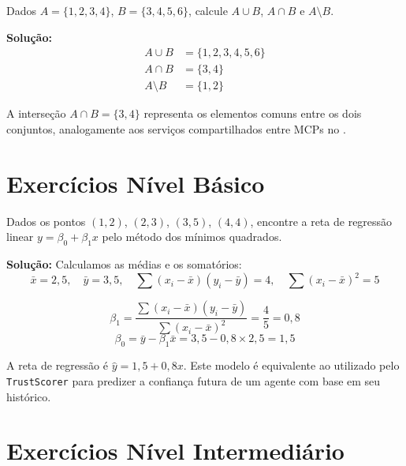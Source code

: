 \begin{exercicio}\label{exer:resol-conj}
Dados \(A = \{1,2,3,4\}\), \(B = \{3,4,5,6\}\), calcule \(A \cup B\),
\(A \cap B\) e \(A \setminus B\).
\end{exercicio}

\textbf{Solução:}
\begin{align*}
A \cup B &= \{1,2,3,4,5,6\} \\
A \cap B &= \{3,4\} \\
A \setminus B &= \{1,2\}
\end{align*}

A interseção \(A \cap B = \{3,4\}\) representa os elementos comuns entre
os dois conjuntos, analogamente aos serviços compartilhados entre MCPs
no \opencodeeco{}.

\section{Exercícios Nível Básico}
\label{sec:exer-nivel-basico}
\nivelbasico

\begin{exercicio}\label{exer:resol-regressao}
Dados os pontos \((1,2)\), \((2,3)\), \((3,5)\), \((4,4)\), encontre a reta
de regressão linear \(y = \beta_0 + \beta_1 x\) pelo método dos mínimos
quadrados.
\end{exercicio}

\textbf{Solução:} Calculamos as médias e os somatórios:
\[
\bar{x} = 2{,}5,\quad \bar{y} = 3{,}5,\quad
\sum (x_i - \bar{x})(y_i - \bar{y}) = 4,\quad
\sum (x_i - \bar{x})^2 = 5
\]

\[
\beta_1 = \frac{\sum (x_i - \bar{x})(y_i - \bar{y})}{\sum (x_i - \bar{x})^2}
       = \frac{4}{5} = 0{,}8
\]
\[
\beta_0 = \bar{y} - \beta_1 \bar{x} = 3{,}5 - 0{,}8 \times 2{,}5 = 1{,}5
\]

A reta de regressão é \(\hat{y} = 1{,}5 + 0{,}8x\). Este modelo é
equivalente ao utilizado pelo \texttt{TrustScorer} para predizer a
confiança futura de um agente com base em seu histórico.

\section{Exercícios Nível Intermediário}
\label{sec:exer-nivel-intermediario}
\nivelintermediario

